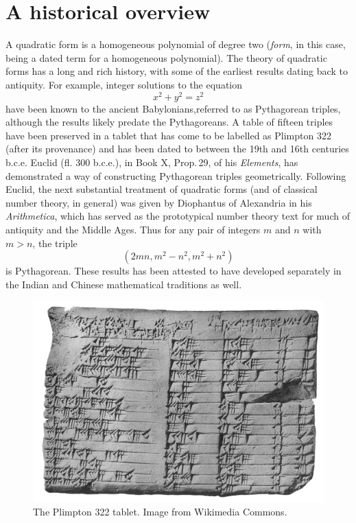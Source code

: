 
\chapter{A historical overview}
\label{chap:history}


A quadratic form is a homogeneous polynomial of degree two (\emph{form}, in this case, being a dated term for a homogeneous polynomial). The theory of quadratic forms has a long and rich history, with some of the earliest results dating back to antiquity. For example, integer solutions to the equation
\[
    x^2 + y^2 = z^2 
\]
have been known to the ancient Babylonians,referred to as Pythagorean triples, although the results likely predate the Pythagoreans. A table of fifteen triples have been preserved in a tablet that has come to be labelled as Plimpton 322 (after its provenance) and has been dated to between the 19th and 16th centuries {\sc b.c.e.} \cite{robson2002words} Euclid (fl. 300 {\sc b.c.e.}), in Book X, Prop.\,29, of his \emph{Elements}, has demonstrated a way of constructing Pythagorean triples geometrically. \cite{euclid1956elements} Following Euclid, the next substantial treatment of quadratic forms (and of classical number theory, in general) was given by Diophantus of Alexandria in his \emph{Arithmetica}, which has served as the prototypical number theory text for much of antiquity and the Middle Ages. \cite{katz2009history} Thus for any pair of integers \(m\) and \(n\) with \(m > n\), the triple
\[
    (2mn, m^2 - n^2, m^2 + n^2)
\]
is Pythagorean. These results has been attested to have developed separately in the Indian and Chinese mathematical traditions as well. \cite{weil1984number}


\begin{figure}
    \centering
    \includegraphics[width=\textwidth]{assets/Plimpton_322.jpg}
    \caption[The Plimpton 322 tablet.]{The Plimpton 322 tablet. Image from Wikimedia Commons.}
    \label{fig:plimpton-322}
\end{figure}

